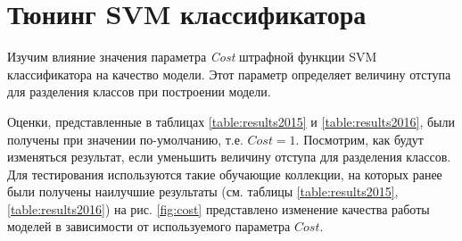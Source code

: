 \section{Тюнинг SVM классификатора}
Изучим влияние значения параметра {\it Cost} штрафной функции SVM классификатора на
качество модели. Этот параметр определяет величину отступа для разделения
классов при построении модели.

Оценки, представленные в таблицах \ref{table:results2015} и \ref{table:results2016},
были получены при значении по-умолчанию, т.е. $Cost=1$.
Посмотрим, как будут изменяться результат, если уменьшить величину отступа для
разделения классов.
Для тестирования используются такие обучающие коллекции, на которых ранее были
получены наилучшие результаты (см. таблицы \ref{table:results2015}, \ref{table:results2016})
на рис. \ref{fig:cost} представлено изменение качества работы моделей в
зависимости от используемого параметра $Cost$.

